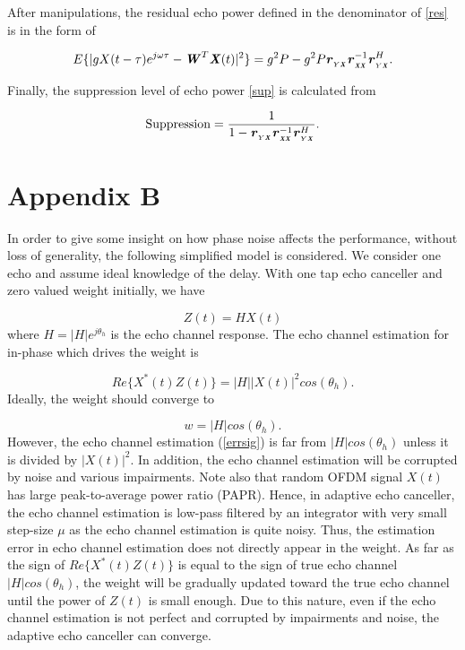\documentclass[twocolumn]{IEEEtran}
\begin{document}
\noindent After manipulations, the residual echo power defined in
the denominator of \eqref{res} is in the form of

\begin{equation}\label{resEcho}
E \{ |g X(t-\tau) e^{j\omega \tau} - \textbf{\textit{W}}^T
\textbf{\textit{X}} (t) |^2 \}=g^2 P-g^2 P
\textbf{\textit{r}}_{{}_{Y\textbf{\textit{X}}}}\textbf{\textit{r}}_{{}_{\textbf{\textit{XX}}}}^{-1}\textbf{\textit{r}}_{{}_{Y\textbf{\textit{X}}}}^H.
\end{equation}

Finally, the suppression level of echo power \eqref{sup} is
calculated from

\begin{equation}
\text{Suppression}=\frac{1}{1-
\textbf{\textit{r}}_{{}_{Y\textbf{\textit{X}}}}\textbf{\textit{r}}_{{}_{\textbf{\textit{XX}}}}^{-1}\textbf{\textit{r}}_{{}_{Y\textbf{\textit{X}}}}^H}.
\end{equation}



\section*{Appendix B}

\setcounter{equation}{0}
\renewcommand{\theequation}{B.\arabic{equation}}

In order to give some insight on how phase noise affects the
performance, without loss of generality, the following simplified
model is considered. We consider one echo and assume ideal knowledge
of the delay. With one tap echo canceller and zero valued weight
initially, we have

\begin{equation}
Z(t)=HX(t)
\end{equation}
where $H=|H|e^{j \theta_h}$ is the echo channel response. The echo
channel estimation for in-phase which drives the weight is

\begin{equation}\label{errsig}
Re\{X^*(t)Z(t)\}=|H||X(t)|^2 cos(\theta_h).
\end{equation}
Ideally, the weight should converge to

\begin{equation}
w=|H| cos(\theta_h).
\end{equation}
However, the echo channel estimation (\ref{errsig}) is far from $|H|
cos(\theta_h)$ unless it is divided by $|X(t)|^2$. In addition, the
echo channel estimation will be corrupted by noise and various
impairments. Note also that random OFDM signal $X(t)$ has large
peak-to-average power ratio (PAPR). Hence, in adaptive echo
canceller, the echo channel estimation is low-pass filtered by an
integrator with very small step-size $\mu$ as the echo channel
estimation is quite noisy. Thus, the estimation error in echo
channel estimation does not directly appear in the weight. As far as
the sign of $Re\{X^*(t)Z(t)\}$ is equal to the sign of true echo
channel $|H| cos(\theta_h)$, the weight will be gradually updated
toward the true echo channel until the power of $Z(t)$ is small
enough. Due to this nature, even if the echo channel estimation is
not perfect and corrupted by impairments and noise, the adaptive
echo canceller can converge.
\end{document}
